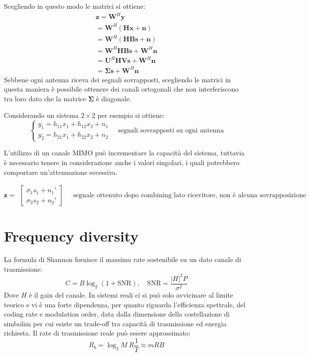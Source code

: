 Scegliendo in questo modo le matrici si ottiene:
\[
    \begin{array}{ll}
        \mathbf{z} = \mathbf{W}^H \mathbf{y}  \\
        = \mathbf{W}^H \left( \mathbf{H} \mathbf{x} + \mathbf{n}  \right) \\  
        = \mathbf{W}^H \left( \mathbf{H} \mathbf{B} \mathbf{s} + \mathbf{n} \right) \\
        = \mathbf{W}^H \mathbf{H} \mathbf{B} \mathbf{s} + \mathbf{W}^H \mathbf{n}  \\
        = \mathbf{U}^H \mathbf{H} \mathbf{V} \mathbf{s} + \mathbf{W}^H \mathbf{n} \\
        = \mathbf{\Sigma} \mathbf{s} + \mathbf{W}^H \mathbf{n}
    \end{array}
\]
Sebbene ogni antenna riceva dei segnali sovrapposti, scegliendo le matrici in questa maniera è possibile ottenere dei canali ortogonali che non interferiscono tra loro dato che la matrice $\mathbf{\Sigma}$ è diagonale.

Considerando un sistema $2 \times 2$ per esempio si ottiene:
\[
    \begin{cases*}
        y_1 = h_{11} x_1 + h_{12} x_2 + n_1 \\
        y_2 = h_{21} x_1 + h_{22} x_2 + n_2
    \end{cases*}
    \quad
    \text{segnali sovrapposti su ogni antenna}
\]

L'utilizzo di un canale MIMO può incrementare la capacità del sistema, tuttavia è necessario tenere in considerazione anche i valori singolari, i quali potrebbero comportare un'attenuazione eccessiva.


\[
    \mathbf{z} = \begin{matrix}
        \begin{bmatrix}
            \sigma_1 s_1 + n_1' \\
            \sigma_2 s_2 + n_2'
        \end{bmatrix}
    \end{matrix}
    \quad 
    \text{segnale ottenuto dopo combining lato ricevitore, non è alcuna sovrapposizione}
\]

\section*{Frequency diversity}

La formula di Shannon fornisce il massimo rate sostenibile su un dato canale di trasmissione:
\[
    C = B \log_2 \left( 1 + \text{SNR} \right), \quad \text{SNR} = \frac{\left| H \right|^2 P}{\sigma^2}
\]
Dove $H$ è il gain del canale.
In sistemi reali ci si può solo avvicinare al limite teorico e vi è una forte dipendenza, per quanto riguarda l'efficienza spettrale, del coding rate e modulation order, data dalla dimensione della costellazione di simbolim per cui esiste un trade-off tra capacità di trasmissione ed energia richiesta. Il rate di trasmissione reale può essere approssimato:
\[
    R_b = \log_2 M \  R \frac{1}{T}  \approx m R B
\]

